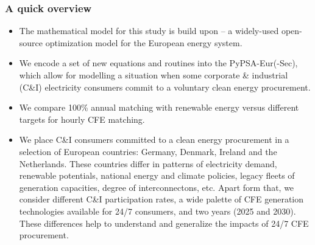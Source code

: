 \begin{frame}
  \frametitle{A quick overview}


{\small
  \begin{itemize}
    
    \item The mathematical model for this study is build upon 
     --
    a widely-used open-source optimization model for the European energy system.

    \item We encode a set of new equations and routines into the PyPSA-Eur(-Sec),
    which allow for modelling a situation when some corporate \& industrial (C\&I) electricity consumers 
    commit to a voluntary clean energy procurement.

    \item We compare 100\% annual matching with renewable energy versus 
    different targets for hourly CFE matching.

    \item We place C\&I consumers committed to a clean energy procurement in a 
    selection of European countries: Germany, Denmark, Ireland and the Netherlands.
    These countries differ in patterns of electricity demand, renewable potentials,
    national energy and climate policies, legacy fleets of generation capacities, degree 
    of interconnectons, etc. Apart form that, we consider different C\&I participation rates, a wide palette 
    of CFE generation technologies available for 24/7 consumers, 
    and two years (2025 and 2030). These differences help to understand and generalize 
    the impacts of 24/7 CFE procurement.
    
  \end{itemize}
}

\end{frame}


